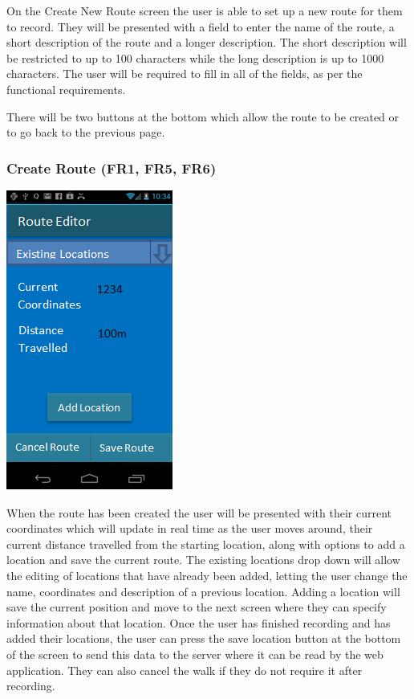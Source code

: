\documentclass{project}
\begin{document}
On the Create New Route screen the user is able to set up a new route for them to record.
They will be presented with a field to enter the name of the route, a short description
of the route and a longer description. The short description will be restricted to up to 
100 characters while the long description is up to 1000 characters. The user will be 
required to fill in all of the fields, as per the functional requirements. 

\bigskip
There will be two buttons at the bottom which allow the route to be created or to go back to the previous page. 

\subsubsection{Create Route (FR1, FR5, FR6)}
\bigskip
\includegraphics{PhoneUI3}
\bigskip

When the route has been created the user will be presented with their current coordinates which will update in real 
time as the user moves around, their current distance travelled from the starting location, along with options to 
add a location and save the current route.
\bigskip
The existing locations drop down will allow the editing of locations that have already been added, 
letting the user change the name, coordinates and description of a previous location.
\bigskip
Adding a location will save the current position and move to the next screen where they can specify information about that location.
Once the user has finished recording and has added their locations, the user can press the save location button at the bottom of the 
screen to send this data to the server where it can be read by the web application. They can also cancel the walk if they do not require it after recording.
\end{document}
